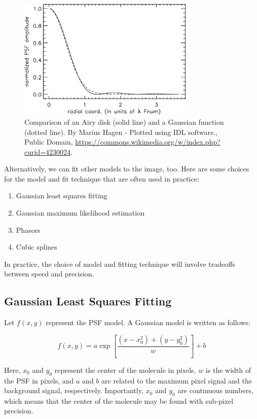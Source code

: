 \documentclass[10pt,a4paper]{book}
\begin{document}
\begin{figure}[ht]
    \centering
    \includegraphics[width=0.75\textwidth]{Airy_vs_gaus.png}
    \caption{Comparison of an Airy disk (solid line) and a Gaussian function (dotted line). By Marius Hagen - Plotted using IDL software., Public Domain, \url{https://commons.wikimedia.org/w/index.php?curid=4230024}.}
    \label{fig:airy-vs-gauss}
\end{figure}

Alternatively, we can fit other models to the image, too. Here are some choices for the model and fit technique that are often used in practice:

\begin{enumerate}
    \item Gaussian least squares fitting
    \item Gaussian maximum likelihood estimation
    \item Phasors
    \item Cubic splines
\end{enumerate}

In practice, the choice of model and fitting technique will involve tradeoffs between speed and precision.

\subsection{Gaussian Least Squares Fitting}

Let $f \left(x, y\right)$ represent the PSF model. A Gaussian model is written as follows:

\begin{equation}
    f \left(x, y\right) = a \exp \left[ \frac{\left(x-x_{0}^2\right) + \left(y - y_{0}^2\right)}{w} \right] + b
\end{equation}

\noindent Here, $x_0$ and $y_0$ represent the center of the molecule in pixels, $w$ is the width of the PSF in pixels, and $a$ and $b$ are related to the maximum pixel signal and the background signal, respectively. Importantly, $x_0$ and $y_0$ are continuous numbers, which means that the center of the molecule may be found with sub-pixel precision.
\end{document}

